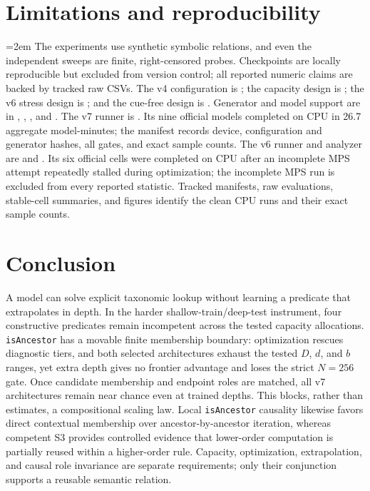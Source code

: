 \documentclass[10pt]{article}
\begin{document}
\section{Limitations and reproducibility}
\begingroup\footnotesize\emergencystretch=2em
The experiments use synthetic symbolic relations, and even the independent sweeps are finite, right-censored probes. Checkpoints are locally reproducible but excluded from version control; all reported numeric claims are backed by tracked raw CSVs. The v4 configuration is ; the capacity design is ; the v6 stress design is ; and the cue-free design is . Generator and model support are in , , , and . The v7 runner is . Its nine official models completed on CPU in 26.7 aggregate model-minutes; the manifest records device, configuration and generator hashes, all gates, and exact sample counts. The v6 runner and analyzer are  and . Its six official cells were completed on CPU after an incomplete MPS attempt repeatedly stalled during optimization; the incomplete MPS run is excluded from every reported statistic. Tracked manifests, raw evaluations, stable-cell summaries, and figures identify the clean CPU runs and their exact sample counts.
\endgroup

\section{Conclusion}
A model can solve explicit taxonomic lookup without learning a predicate that extrapolates in depth. In the harder shallow-train/deep-test instrument, four constructive predicates remain incompetent across the tested capacity allocations. \texttt{isAncestor} has a movable finite membership boundary: optimization rescues diagnostic tiers, and both selected architectures exhaust the tested $D$, $d$, and $b$ ranges, yet extra depth gives no frontier advantage and loses the strict $N=256$ gate. Once candidate membership and endpoint roles are matched, all v7 architectures remain near chance even at trained depths. This blocks, rather than estimates, a compositional scaling law. Local \texttt{isAncestor} causality likewise favors direct contextual membership over ancestor-by-ancestor iteration, whereas competent S3 provides controlled evidence that lower-order computation is partially reused within a higher-order rule. Capacity, optimization, extrapolation, and causal role invariance are separate requirements; only their conjunction supports a reusable semantic relation.
\end{document}
